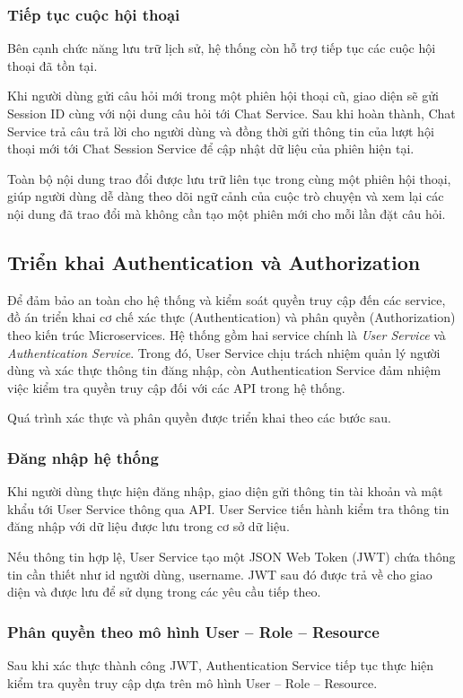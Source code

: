 \documentclass[../DoAn.tex]{subfiles}
\begin{document}
\subsubsection{Tiếp tục cuộc hội thoại}
Bên cạnh chức năng lưu trữ lịch sử, hệ thống còn hỗ trợ tiếp tục các cuộc hội thoại đã tồn tại.

Khi người dùng gửi câu hỏi mới trong một phiên hội thoại cũ, giao diện sẽ gửi Session ID cùng với nội dung câu hỏi tới Chat Service. Sau khi hoàn thành, Chat Service trả câu trả lời cho người dùng và đồng thời gửi thông tin của lượt hội thoại mới tới Chat Session Service để cập nhật dữ liệu của phiên hiện tại.

Toàn bộ nội dung trao đổi được lưu trữ liên tục trong cùng một phiên hội thoại, giúp người dùng dễ dàng theo dõi ngữ cảnh của cuộc trò chuyện và xem lại các nội dung đã trao đổi mà không cần tạo một phiên mới cho mỗi lần đặt câu hỏi.

\subsection{Triển khai Authentication và Authorization}
Để đảm bảo an toàn cho hệ thống và kiểm soát quyền truy cập đến các service, đồ án triển khai cơ chế xác thực (Authentication) và phân quyền (Authorization) theo kiến trúc Microservices. Hệ thống gồm hai service chính là \textit{User Service} và \textit{Authentication Service}. Trong đó, User Service chịu trách nhiệm quản lý người dùng và xác thực thông tin đăng nhập, còn Authentication Service đảm nhiệm việc kiểm tra quyền truy cập đối với các API trong hệ thống.

Quá trình xác thực và phân quyền được triển khai theo các bước sau.

\subsubsection{Đăng nhập hệ thống}
Khi người dùng thực hiện đăng nhập, giao diện gửi thông tin tài khoản và mật khẩu tới User Service thông qua API. User Service tiến hành kiểm tra thông tin đăng nhập với dữ liệu được lưu trong cơ sở dữ liệu.

Nếu thông tin hợp lệ, User Service tạo một JSON Web Token (JWT) chứa thông tin cần thiết như id người dùng, username. JWT sau đó được trả về cho giao diện và được lưu để sử dụng trong các yêu cầu tiếp theo.

\subsubsection{Phân quyền theo mô hình User -- Role -- Resource}
Sau khi xác thực thành công JWT, Authentication Service tiếp tục thực hiện kiểm tra quyền truy cập dựa trên mô hình User -- Role -- Resource.
\end{document}
